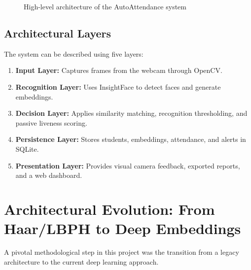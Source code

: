\documentclass[12pt,a4paper]{report}
\newcommand{\JustifiedNormal}{\fontsize{12}{14}\selectfont\justifying\setlength{\parindent}{0pt}}
\begin{document}
\begin{figure}[H]
\centering
{}
\caption{High-level architecture of the AutoAttendance system}
\end{figure}

\subsection{Architectural Layers}
\JustifiedNormal
The system can be described using five layers:

\begin{enumerate}[leftmargin=*]
  \item \textbf{Input Layer:} Captures frames from the webcam through OpenCV.
  \item \textbf{Recognition Layer:} Uses InsightFace to detect faces and generate embeddings.
  \item \textbf{Decision Layer:} Applies similarity matching, recognition thresholding, and passive liveness scoring.
  \item \textbf{Persistence Layer:} Stores students, embeddings, attendance, and alerts in SQLite.
  \item \textbf{Presentation Layer:} Provides visual camera feedback, exported reports, and a web dashboard.
\end{enumerate}

\section{Architectural Evolution: From Haar/LBPH to Deep Embeddings}
\JustifiedNormal
A pivotal methodological step in this project was the transition from a legacy architecture to the current deep learning approach. 
\end{document}
